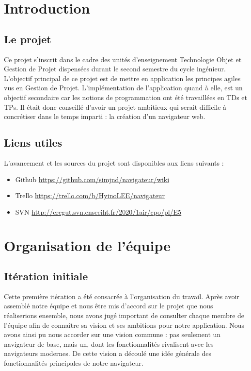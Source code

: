 \documentclass[10pt,a4paper]{article}
\begin{document}
\thispagestyle{empty}


\thispagestyle{empty}
\tableofcontents

\newpage
\setcounter{page}{1}
\section{Introduction}
\subsection{Le projet}
Ce projet s'inscrit dans le cadre des unités d'enseignement Technologie Objet et Gestion de Projet dispensées durant le second semestre du cycle ingénieur. L'objectif principal de ce projet est de mettre en application les principes agiles vus en Gestion de Projet. L'implémentation de l'application quand à elle, est un objectif secondaire car les notions de programmation ont été travaillées en TDs et TPs. Il était donc conseillé d'avoir un projet ambitieux qui serait difficile à concrétiser dans le temps imparti : la création d'un navigateur web.

\subsection{Liens utiles}
L'avancement et les sources du projet sont disponibles aux liens suivants :
\begin{itemize}
\item Github \href{https://github.com/simjnd/navigateur/wiki}{https://github.com/simjnd/navigateur/wiki}
\item Trello \href{https://trello.com/b/HyinoLEE/navigateur}{https://trello.com/b/HyinoLEE/navigateur} 
\item SVN \href{http://cregut.svn.enseeiht.fr/2020/1air/cpo/pl/E5}{http://cregut.svn.enseeiht.fr/2020/1air/cpo/pl/E5}
\end{itemize}

\newpage

\section{Organisation de l'équipe}
\subsection{Itération initiale}
Cette première itération a été consacrée à l'organisation du travail. Après avoir assemblé notre équipe et nous être mis d’accord sur le projet que nous réaliserions ensemble, nous avons jugé important de consulter chaque membre de l’équipe afin de connaître sa vision et ses ambitions pour notre application. Nous avons ainsi pu nous accorder sur une vision commune : pas seulement un navigateur de base, mais un, dont les fonctionnalités rivalisent avec les navigateurs modernes. De cette vision a découlé une idée générale des fonctionnalités principales de notre navigateur.\\ 
\end{document}
